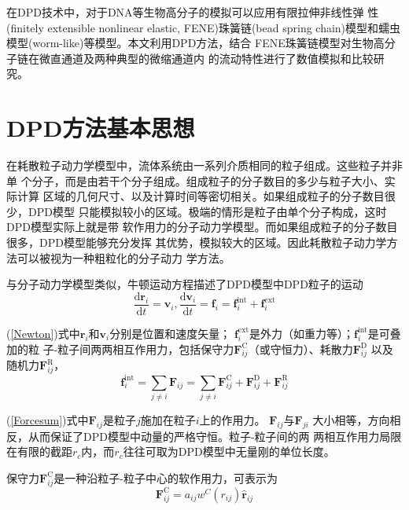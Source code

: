 \documentclass[twoside,12pt]{article}
\begin{document}
在DPD技术中，对于DNA等生物高分子的模拟可以应用有限拉伸非线性弹
性(finitely extensible nonlinear elastic, FENE)珠簧链(bead spring chain)模型\cite{Larson,Fan_X}和蠕虫模型(worm-like)\cite{H_Pan}等模型。本文利用DPD方法，结合
FENE珠簧链模型对生物高分子链在微直通道及两种典型的微缩通道内
的流动特性进行了数值模拟和比较研究。

\section{ DPD方法基本思想}

在耗散粒子动力学模型中，流体系统由一系列介质相同的粒子组成。这些粒子并非单
个分子，而是由若干个分子组成。组成粒子的分子数目的多少与粒子大小、实际计算
区域的几何尺寸、以及计算时间等密切相关。如果组成粒子的分子数目很少，DPD模型
只能模拟较小的区域。极端的情形是粒子由单个分子构成，这时DPD模型实际上就是带
软作用力的分子动力学模型。而如果组成粒子的分子数目很多，DPD模型能够充分发挥
其优势，模拟较大的区域。因此耗散粒子动力学方法可以被视为一种粗粒化的分子动力
学方法。

与分子动力学模型类似，牛顿运动方程描述了DPD模型中DPD粒子的运动
\begin{equation}\label{Newton}
\frac{\mathrm{d}\mathbf{r}_i}{\mathrm{d}t} = \mathbf{v}_i,
\frac{\mathrm{d}\mathbf{v}_i}{\mathrm{d}t} = \mathbf{f}_i = \mathbf{f}_i^\mathrm{int} + \mathbf{f}_i^\mathrm{ext}
\end{equation}


(\ref{Newton})式中$\mathbf{r}_i$和$\mathbf{v}_i$分别是位置和速度矢量；
$\mathbf{f}_i^\mathrm{ext}$是外力（如重力等）；$\mathbf{f}_i^\mathrm{int}$是可叠加的粒
子-粒子间两两相互作用力，包括保守力$\mathbf{F}_{ij}^\mathrm{C}$（或守恒力）、耗散力$\mathbf{F}_{ij}^\mathrm{D}$ 以及随机力$\mathbf{F}_{ij}^\mathrm{R}$，
\begin{equation}\label{Forcesum}
\mathbf{f}_i^\mathrm{int} =\sum_{j\neq i} \mathbf{F}_{ij} = \sum_{j\neq i} \mathbf{F}_{ij}^\mathrm{C} + \mathbf{F}_{ij}^\mathrm{D} + \mathbf{F}_{ij}^\mathrm{R}
\end{equation}

(\ref{Forcesum})式中$\mathbf{F}_{ij}$是粒子$j$施加在粒子$i$上的作用力。
$\mathbf{F}_{ij}$与$\mathbf{F}_{ji}$ 大小相等，方向相反，从而保证了DPD模型中动量的严格守恒。粒子-粒子间的两
两相互作用力局限在有限的截距$r_c$内，而$r_c$往往可取为DPD模型中无量刚的单位长度。

保守力$\mathbf{F}_{ij}^\mathrm{C}$是一种沿粒子-粒子中心的软作用力，可表示为
\begin{equation}\label{Fc}
\mathbf{F}_{ij}^\mathrm{C} = a_{ij}w^C(r_{ij})\mathbf{\hat{r}}_{ij}
\end{equation}
\end{document}
